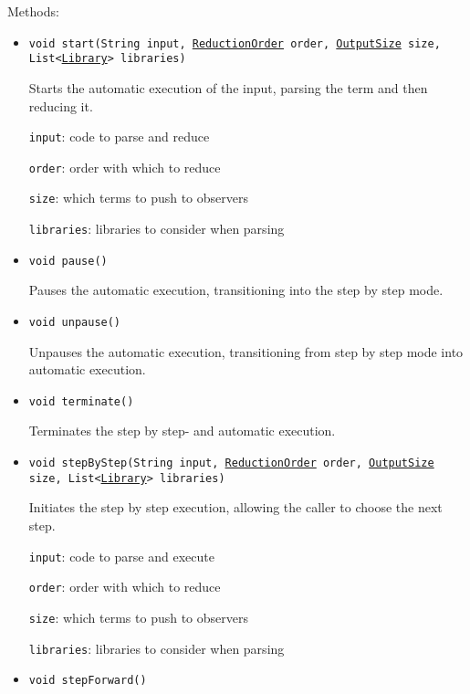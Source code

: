 Methods:
\begin{itemize}
\item \texttt{void start(String input, \hyperref[type:edu.kit.wavelength.client.model.reduction.ReductionOrder]{ReductionOrder} order, \hyperref[type:edu.kit.wavelength.client.model.output.OutputSize]{OutputSize} size, List<\hyperref[type:edu.kit.wavelength.client.model.library.Library]{Library}> libraries)}

Starts the automatic execution of the input, parsing the term and then reducing it.

\texttt{input}: code to parse and reduce

\texttt{order}: order with which to reduce

\texttt{size}: which terms to push to observers

\texttt{libraries}: libraries to consider when parsing

\item \texttt{void pause()}

Pauses the automatic execution, transitioning into the step by step mode.

\item \texttt{void unpause()}

Unpauses the automatic execution, transitioning from step by step mode into automatic execution.

\item \texttt{void terminate()}

Terminates the step by step- and automatic execution.

\item \texttt{void stepByStep(String input, \hyperref[type:edu.kit.wavelength.client.model.reduction.ReductionOrder]{ReductionOrder} order, \hyperref[type:edu.kit.wavelength.client.model.output.OutputSize]{OutputSize} size, List<\hyperref[type:edu.kit.wavelength.client.model.library.Library]{Library}> libraries)}

Initiates the step by step execution, allowing the caller to choose the next step.

\texttt{input}: code to parse and execute

\texttt{order}: order with which to reduce

\texttt{size}: which terms to push to observers

\texttt{libraries}: libraries to consider when parsing

\item \texttt{void stepForward()}


\end{itemize}
